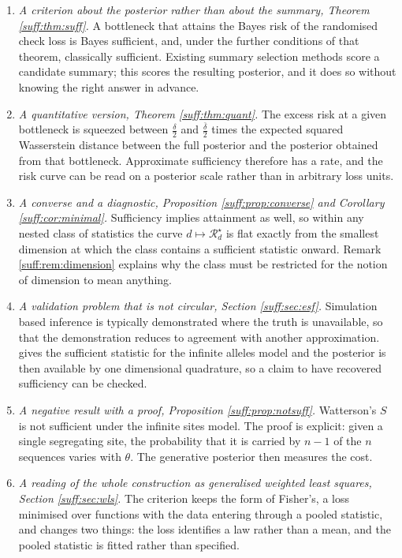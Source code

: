 \begin{enumerate}[leftmargin=1.8em,itemsep=3pt]
\item \emph{A criterion about the posterior rather than about the summary, Theorem
\ref{suff:thm:suff}.} A bottleneck that attains the Bayes risk of the randomised check loss is
Bayes sufficient, and, under the further conditions of that theorem, classically sufficient. Existing summary
selection methods score a candidate summary; this scores the resulting posterior, and it does
so without knowing the right answer in advance.
\item \emph{A quantitative version, Theorem \ref{suff:thm:quant}.} The excess risk at a given
bottleneck is squeezed between $\tfrac{\delta}{2}$ and $\tfrac{\bar\delta}{2}$ times the expected
squared Wasserstein distance between the full posterior and the posterior obtained from
that bottleneck. Approximate sufficiency therefore has a rate, and the risk curve can be
read on a posterior scale rather than in arbitrary loss units.
\item \emph{A converse and a diagnostic, Proposition \ref{suff:prop:converse} and Corollary
\ref{suff:cor:minimal}.} Sufficiency implies attainment as well, so within any nested class
of statistics the curve $d\mapsto\mathcal{R}^\star_d$ is flat exactly from the smallest
dimension at which the class contains a sufficient statistic onward. Remark \ref{suff:rem:dimension} explains why the class must be
restricted for the notion of dimension to mean anything.
\item \emph{A validation problem that is not circular, Section \ref{suff:sec:esf}.}
Simulation based inference is typically demonstrated where the truth is unavailable, so that
the demonstration reduces to agreement with another approximation. \citet{suff:ewens1972}
gives the sufficient statistic for the infinite alleles model and the posterior is then
available by one dimensional quadrature, so a claim to have recovered sufficiency can be
checked.
\item \emph{A negative result with a proof, Proposition \ref{suff:prop:notsuff}.} Watterson's
$S$ is not sufficient under the infinite sites model. The proof is explicit: given a single
segregating site, the probability that it is carried by $n-1$ of the $n$ sequences
varies with $\theta$. The generative posterior then measures the cost.
\item \emph{A reading of the whole construction as generalised weighted least squares,
Section \ref{suff:sec:wls}.} The criterion keeps the form of Fisher's, a loss minimised over
functions with the data entering through a pooled statistic, and changes two things: the loss
identifies a law rather than a mean, and the pooled statistic is fitted rather than specified.
\end{enumerate}

